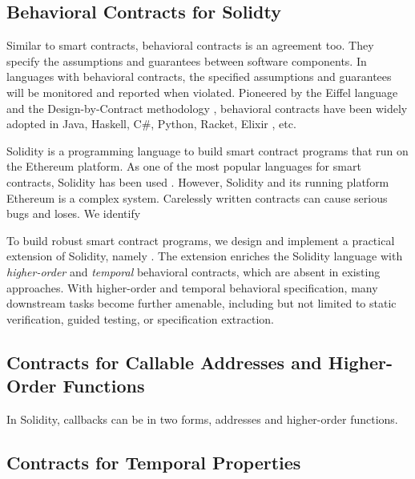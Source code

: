 \subsection*{\textbf{Behavioral Contracts for Solidty}}

Similar to smart contracts, behavioral contracts is an agreement too.  They
specify the assumptions and guarantees between software components.
In languages with behavioral contracts, the specified assumptions and
guarantees will be monitored and reported when violated.
Pioneered by the Eiffel language \cite{DBLP:books/ph/Meyer91} and the
Design-by-Contract methodology \cite{DBLP:conf/tools/Meyer98a}, behavioral
contracts have been widely adopted in Java, Haskell, C\#, Python, Racket,
Elixir \cite{DBLP:conf/erlang/0001BBHMEF22}, etc. 

Solidity is a programming language to build smart contract programs that run on
the Ethereum platform.
As one of the most popular languages for smart contracts, Solidity has been
used .
However, Solidity and its running platform Ethereum is a complex system.
Carelessly written contracts can cause serious bugs and loses.
We identify 

To build robust smart contract programs, we design and implement a practical
extension of Solidity, namely \lang.
The extension enriches the Solidity language with \emph{higher-order} and
\emph{temporal} behavioral contracts, which are absent in existing approaches.
With higher-order and temporal behavioral specification, many downstream
tasks become further amenable, including but not limited to static verification,
guided testing, or specification extraction.

\subsection*{\textbf{Contracts for Callable Addresses and Higher-Order Functions}}

In Solidity, callbacks can be in two forms, addresses and higher-order functions.


\subsection*{\textbf{Contracts for Temporal Properties}}

